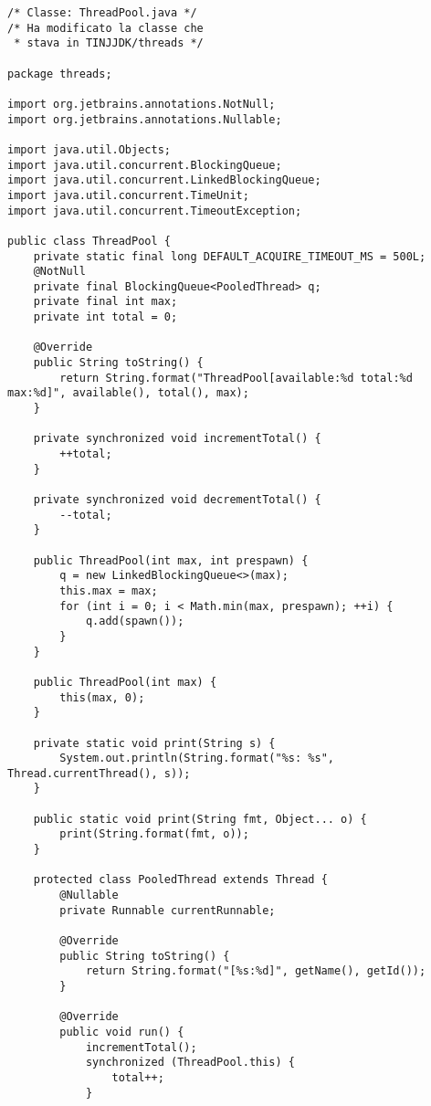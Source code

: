 \begin{lstlisting}
/* Classe: ThreadPool.java */
/* Ha modificato la classe che
 * stava in TINJJDK/threads */

package threads;

import org.jetbrains.annotations.NotNull;
import org.jetbrains.annotations.Nullable;

import java.util.Objects;
import java.util.concurrent.BlockingQueue;
import java.util.concurrent.LinkedBlockingQueue;
import java.util.concurrent.TimeUnit;
import java.util.concurrent.TimeoutException;

public class ThreadPool {
    private static final long DEFAULT_ACQUIRE_TIMEOUT_MS = 500L;
    @NotNull
    private final BlockingQueue<PooledThread> q;
    private final int max;
    private int total = 0;

    @Override
    public String toString() {
        return String.format("ThreadPool[available:%d total:%d max:%d]", available(), total(), max);
    }

    private synchronized void incrementTotal() {
        ++total;
    }

    private synchronized void decrementTotal() {
        --total;
    }

    public ThreadPool(int max, int prespawn) {
        q = new LinkedBlockingQueue<>(max);
        this.max = max;
        for (int i = 0; i < Math.min(max, prespawn); ++i) {
            q.add(spawn());
        }
    }

    public ThreadPool(int max) {
        this(max, 0);
    }

    private static void print(String s) {
        System.out.println(String.format("%s: %s", Thread.currentThread(), s));
    }

    public static void print(String fmt, Object... o) {
        print(String.format(fmt, o));
    }

    protected class PooledThread extends Thread {
        @Nullable
        private Runnable currentRunnable;

        @Override
        public String toString() {
            return String.format("[%s:%d]", getName(), getId());
        }

        @Override
        public void run() {
            incrementTotal();
            synchronized (ThreadPool.this) {
                total++;
            }


\end{lstlisting}
